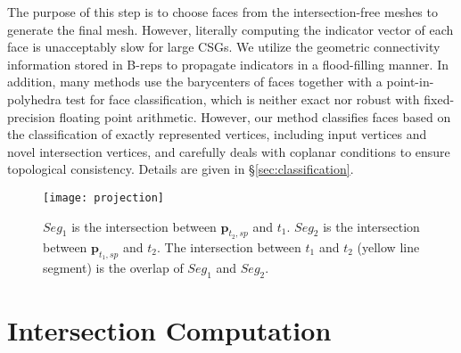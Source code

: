 
The purpose of this step is to choose faces from the intersection-free meshes to generate the final mesh. However, literally computing the indicator vector of each face is unacceptably slow for large CSGs. We utilize the geometric connectivity information stored in B-reps to propagate indicators in a flood-filling manner. In addition, many methods use the barycenters of faces together with a point-in-polyhedra test for face classification, which is neither exact nor robust with fixed-precision floating point arithmetic. However, our method classifies faces based on the classification of exactly represented vertices, including input vertices and novel intersection vertices, and carefully deals with coplanar conditions to ensure topological consistency. Details are given in \S\ref{sec:classification}.


\begin{figure}[t]
\centering
\texttt{[image: projection]}
\caption{$Seg_1$ is the intersection between $\bm{p}_{t_2, sp}$ and $t_1$. $Seg_2$ is the intersection between $\bm{p}_{t_1, sp}$ and $t_2$. The intersection between $t_1$ and $t_2$ (yellow line segment) is the overlap of $Seg_1$ and $Seg_2$.}
\label{fig_projection}
\end{figure}
\section{Intersection Computation}

\label{section:isect}

